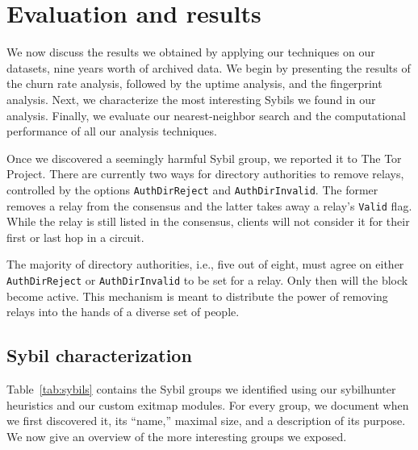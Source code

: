 \section{Evaluation and results}
\label{sec:results}
We now discuss the results we obtained by applying our techniques on our
datasets, nine years worth of archived data.  We begin by presenting the results
of the churn rate analysis, followed by the uptime analysis, and the fingerprint
analysis.  Next, we characterize the most interesting Sybils we found in our
analysis.  Finally, we evaluate our nearest-neighbor search and the
computational performance of all our analysis techniques.

Once we discovered a seemingly harmful Sybil group, we reported it to The Tor
Project.  There are currently two ways for directory authorities to remove
relays, controlled by the options \texttt{AuthDirReject} and
\texttt{AuthDirInvalid}.  The former removes a relay from the consensus and the
latter takes away a relay's \texttt{Valid} flag.  While the relay is still
listed in the consensus, clients will not consider it for their first or last
hop in a circuit.

The majority of directory authorities, i.e., five out of eight, must agree on
either \texttt{AuthDirReject} or \texttt{AuthDirInvalid} to be set for a relay.
Only then will the block become active.  This mechanism is meant to distribute
the power of removing relays into the hands of a diverse set of people.

\subsection{Sybil characterization}
\label{sec:sybil_groups}
Table~\ref{tab:sybils} contains the Sybil groups we identified using our
sybilhunter heuristics and our custom exitmap modules.  For every group, we
document when we first discovered it, its ``name,'' maximal size, and a
description of its purpose.  We now give an overview of the more interesting
groups we exposed.

